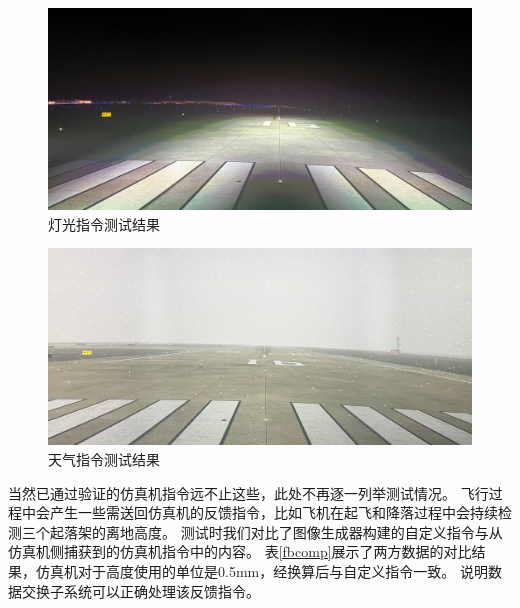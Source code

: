 \clearpage
\begin{figure}[h!]
    \begin{center}
        \includegraphics[width=.9\textwidth]{pictures/lighttest.jpg}
        \caption{灯光指令测试结果}
        \label{lighttest}
    \end{center}
\end{figure}
\begin{figure}[h!]
    \begin{center}
        \includegraphics[width=.9\textwidth]{pictures/snowtest.jpg}
        \caption{天气指令测试结果}
        \label{snowtest}
    \end{center}
\end{figure}
\par
当然已通过验证的仿真机指令远不止这些，此处不再逐一列举测试情况。
飞行过程中会产生一些需送回仿真机的反馈指令，比如飞机在起飞和降落过程中会持续检测三个起落架的离地高度。
测试时我们对比了图像生成器构建的自定义指令与从仿真机侧捕获到的仿真机指令中的内容。
表\ref{fbcomp}展示了两方数据的对比结果，仿真机对于高度使用的单位是0.5mm，经换算后与自定义指令一致。
说明数据交换子系统可以正确处理该反馈指令。
